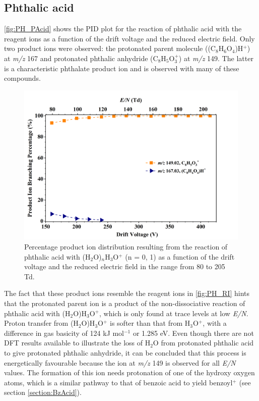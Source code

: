 \subsection{Phthalic acid}



\autoref{fig:PH_PAcid} shows the PID plot for the reaction of phthalic acid with the reagent ions as a function of the drift voltage and the reduced electric field. 
%
Only two product ions were observed: the protonated parent molecule  ((C$_8$H$_6$O$_4$)H$^+$)  at \textit{m/z} 167 and  protonated phthalic anhydride (C$_8$H$_{5}$O$_3^+$) at \textit{m/z} 149.
%
The latter is a characteristic phthalate product ion and is observed with many of these compounds.

    \begin{figure}[htb]
    \centering
    \includegraphics[height=0.35\textheight]{pics/Pacid-BR.png}
    \caption{Percentage product ion distribution resulting from the reaction of phthalic acid with (H$_2$O)$_n$H$_3$O$^+$ (n = 0, 1) as a function of the drift voltage and the reduced electric field in the range from 80 to 205 Td.}
    \label{fig:PH_PAcid}
    \end{figure}


The fact that these product ions resemble the reagent ions in \autoref{fig:PH_RI} hints that the protonated parent ion is a product of the non-dissociative reaction of phthalic acid with (H$_2$O)H$_3$O$^+$, which is only found at trace levels at low \textit{E/N}.
%
Proton transfer from (H$_2$O)H$_3$O$^+$ is  softer  than that from H$_3$O$^+$, with a difference in gas basicity  of 124 kJ mol$^{-1}$ or 1.285 eV.
%
Even though there are not DFT results available to illustrate the loss of H$_2$O from protonated phthalic acid to give protonated phthalic anhydride, it can be concluded that this process is energetically favourable because the ion at \textit{m/z} 149 is observed for all \textit{E/N} values. 
%
The formation of this ion needs  protonation of one of the hydroxy oxygen atoms, which is a similar pathway to that of benzoic acid to yield benzoyl$^+$ (see section \ref{section:BzAcid}). %









